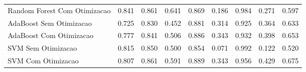 \begin{table}[H]
\begin{adjustwidth}{ -1in }{ -1in }
\begin{tabular}{lrrrrrrrr}
      Random Forest Com Otimizacao &                        0.841 &                         0.861 &                            0.641 &                            0.869 &                          0.186 &                          0.984 &                                     0.271 &                                 0.597 \\
           AdaBoost Sem Otimizacao &                        0.725 &                         0.830 &                            0.452 &                            0.881 &                          0.314 &                          0.925 &                                     0.364 &                                 0.633 \\
           AdaBoost Com Otimizacao &                        0.777 &                         0.841 &                            0.506 &                            0.886 &                          0.343 &                          0.932 &                                     0.398 &                                 0.653 \\
                SVM Sem Otimizacao &                        0.815 &                         0.850 &                            0.500 &                            0.854 &                          0.071 &                          0.992 &                                     0.122 &                                 0.520 \\
                SVM Com Otimizacao &                        0.807 &                         0.861 &                            0.591 &                            0.889 &                          0.343 &                          0.956 &                                     0.429 &                                 0.675 \\
\bottomrule
\end{tabular}
    \end{adjustwidth}
    \renewcommand{\arraystretch}{1.0} %
\end{table}
